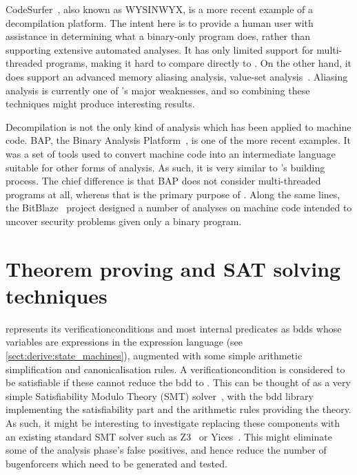 CodeSurfer~\cite{Balakrishnan2008,Balakrishnan2005a}, also known as
WYSINWYX, is a more recent example of a decompilation platform.  The
intent here is to provide a human user with assistance in determining
what a binary-only program does, rather than supporting extensive
automated analyses.  It has only limited support for multi-threaded
programs, making it hard to compare directly to {\technique}.  On the
other hand, it does support an advanced memory aliasing analysis,
value-set analysis~\cite{Balakrishnan2004}.  Aliasing analysis is
currently one of {\technique}'s major weaknesses, and so combining
these techniques might produce interesting results.

Decompilation is not the only kind of analysis which has been applied
to machine code.  BAP, the Binary Analysis
Platform~\cite{Brumley2011}, is one of the more recent
examples\poorstyle.  It was a set of tools used to convert machine
code into an intermediate language suitable for other forms of
analysis.  As such, it is very similar to {\technique}'s
{\StateMachine} building process.  The chief difference is that BAP
does not consider multi-threaded programs at all, whereas that is the
primary purpose of {\technique}.  Along the same lines, the
BitBlaze~\cite{Song2008} project designed a number of analyses on
machine code intended to uncover security problems given only a binary
program.  

\section{Theorem proving and SAT solving techniques}

{\Technique} represents its \glspl{verificationcondition} and most
internal predicates as \glspl{bdd} whose variables are expressions in
the {\StateMachine} expression language (see
\autoref{sect:derive:state_machines}), augmented with some simple
arithmetic simplification and canonicalisation rules.  A
\gls{verificationcondition} is considered to be satisfiable if these
cannot reduce the \gls{bdd} to \false.  This can be thought of as a
very simple Satisfiability Modulo Theory (SMT)
solver~\cite{Barrett2009}, with the \gls{bdd} library implementing the
satisfiability part and the arithmetic rules providing the theory.  As
such, it might be interesting to investigate replacing these
components with an existing standard SMT solver such as
Z3~\cite{Moura2008} or Yices~\cite{Dutertre2006}.  This might
eliminate some of the analysis phase's false positives, and hence
reduce the number of \glspl{bugenforcer} which need to be generated
and tested.

